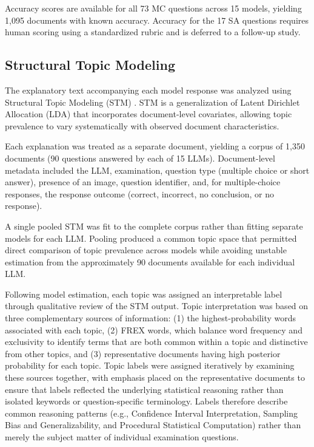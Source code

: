 \documentclass[APA,LATO2COL]{WileyNJDv5}
\begin{document}
Accuracy scores are available for all 73 MC questions across 15 models,
yielding 1,095 documents with known accuracy. Accuracy for the 17 SA
questions requires human scoring using a standardized rubric and is deferred
to a follow-up study.

\subsection{Structural Topic Modeling}
\label{sec:stm}

The explanatory text accompanying each model response was analyzed using
Structural Topic Modeling (STM) \cite{roberts2019}. STM is a
generalization of Latent Dirichlet Allocation (LDA)
\cite{blei2003} that incorporates document-level covariates, allowing
topic prevalence to vary systematically with observed document
characteristics.

Each explanation was treated as a separate document, yielding a corpus of
1,350 documents (90 questions answered by each of 15 LLMs). Document-level
metadata included the LLM, examination, question type (multiple choice or
short answer), presence of an image, question identifier, and, for
multiple-choice responses, the response outcome (correct, incorrect, no
conclusion, or no response).

A single pooled STM was fit to the complete corpus rather than fitting separate models for each LLM. Pooling produced a common topic space that permitted direct comparison of topic prevalence across models while avoiding unstable estimation from the approximately 90 documents available for each individual LLM.

Following model estimation, each topic was assigned an interpretable label through qualitative review of the STM output. Topic interpretation was based on three complementary sources of information: (1) the highest-probability words associated with each topic, (2) FREX words, which balance word frequency and exclusivity to identify terms that are both common within a topic and distinctive from other topics, and (3) representative documents having high posterior probability for each topic. Topic labels were assigned iteratively by examining these sources together, with emphasis placed on the representative documents to ensure that labels reflected the underlying statistical reasoning rather than isolated keywords or question-specific terminology. Labels therefore describe common reasoning patterns (e.g., Confidence Interval Interpretation, Sampling Bias and Generalizability, and Procedural Statistical Computation) rather than merely the subject matter of individual examination questions.
\end{document}
